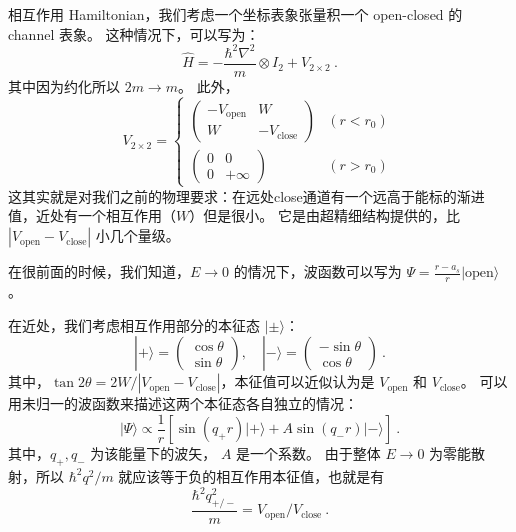 
相互作用 Hamiltonian，我们考虑一个坐标表象张量积一个 open-closed 的 channel 表象。 这种情况下，可以写为：
\begin{equation}
\hat{H} = -\frac{\hbar^2\nabla^2}{m}\otimes I_2+V_{2\times2}~.
\end{equation}
其中因为约化所以 $2m\to m$。 此外，
\begin{equation}
V_{2\times2} = \begin{cases}
\left(\begin{matrix}
-V_{\text{open}} & W\\
W & -V_{\text{close}}
\end{matrix}\right) & (r < r_0)\\
\left(\begin{matrix}
0 & 0\\
0 & +\infty
\end{matrix}\right) & (r > r_0)
\end{cases}~
\end{equation}
这其实就是对我们之前的物理要求：在远处close通道有一个远高于能标的渐进值，近处有一个相互作用（$W$）但是很小。 它是由超精细结构提供的，比 $|V_{\text{open}}-V_{\text{close}}|$ 小几个量级。

在很前面的时候，我们知道，$E\to0$ 的情况下，波函数可以写为 $\Psi=\frac{r-a_s}{r}|\text{open}\rangle$。

在近处，我们考虑相互作用部分的本征态 $|\pm\rangle$：
\begin{equation}
|+\rangle = \left(\begin{matrix}\cos\theta\\\sin\theta\end{matrix}\right),\quad |-\rangle = \left(\begin{matrix}-\sin\theta\\\cos\theta\end{matrix}\right)~.
\end{equation}
其中，$\tan2\theta = 2W/|V_{\text{open}}-V_{\text{close}}|$，本征值可以近似认为是 $V_{\text{open}}$ 和 $V_{\text{close}}$。 可以用未归一的波函数来描述这两个本征态各自独立的情况：
\begin{equation}
|\Psi\rangle\propto\frac{1}{r}\left[\sin(q_+r)|+\rangle + A\sin(q_-r)|-\rangle\right]~.
\end{equation}
其中，$q_+,q_-$ 为该能量下的波矢， $A$ 是一个系数。 由于整体 $E\to0$ 为零能散射，所以 $\hbar^2q^2/m$ 就应该等于负的相互作用本征值，也就是有
\begin{equation}
\frac{\hbar^2q_{+/-}^2}{m} = V_{\text{open}}/V_{\text{close}}~.
\end{equation}

